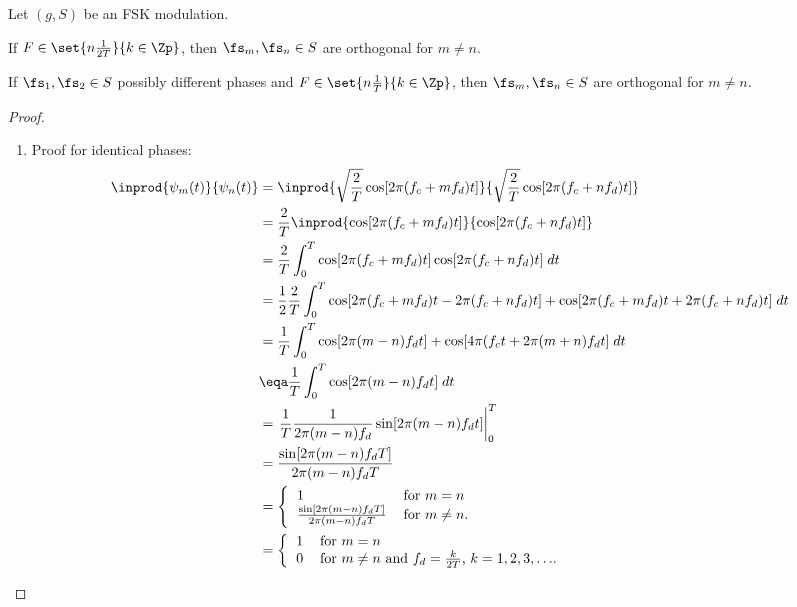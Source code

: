 \begin{theorem}
Let $(g,S)$ be an FSK modulation.
\begin{enume}
  \item If $F\in\set{n\frac{1}{2T}}{k\in\Zp}$, 
        then $\fs_m,\fs_n\in S$ are orthogonal for $m\not=n$.
  \item If $\fs_1,\fs_2\in S$ possibly different phases and
        $F\in\set{n\frac{1}{T}}{k\in\Zp}$, 
        then $\fs_m,\fs_n\in S$ are orthogonal for $m\not=n$.
\end{enume}
\end{theorem}
\begin{proof}

\begin{enumerate}
  \item Proof for identical phases:
\begin{align*}
   \inprod{\psi_m(t)}{\psi_n(t)}
     &=   \inprod{\sqrt{\frac{2}{T}}\cos[2\pi (f_c+mf_d)t]}
                 {\sqrt{\frac{2}{T}}\cos[2\pi (f_c+nf_d)t]}
   \\&=   \frac{2}{T}\inprod{\cos[2\pi (f_c+mf_d)t]}{\cos[2\pi (f_c+nf_d)t]}
   \\&=   \frac{2}{T}\int_0^T \cos[2\pi (f_c+mf_d)t] \cos[2\pi (f_c+nf_d)t] \; dt
   \\&=   \frac{1}{2}\frac{2}{T}\int_0^T \cos[2\pi(f_c+mf_d)t-2\pi(f_c+nf_d)t]+  \cos[2\pi(f_c+mf_d)t+2\pi(f_c+nf_d)t] \; dt
   \\&=   \frac{1}{T}\int_0^T \cos[2\pi(m-n)f_dt] + \cos[4\pi(f_ct+2\pi(m+n)f_dt] \; dt
   \\&\eqa \frac{1}{T}\int_0^T \cos[2\pi(m-n)f_dt]  \; dt
   \\&=   \left.\frac{1}{T} \frac{1}{2\pi(m-n)f_d} \sin[2\pi(m-n)f_dt] \right|_0^T
   \\&=   \frac{\sin[2\pi(m-n)f_dT]}{2\pi(m-n)f_d T} 
   \\&=   \left\{
          \begin{tabular}{ll}
             $1$                                           & for $m=n$ \\
             $\frac{\sin[2\pi(m-n)f_dT]}{2\pi(m-n)f_d T}$  & for $m\ne n$.
          \end{tabular}
          \right.
   \\&=   \left\{
          \begin{tabular}{ll}
             $1$                                           & for $m=n$ \\
             $0$  &       for $m\ne n$ and $f_d=\frac{k}{2T}$, $k=1,2,3,\ldots$.
          \end{tabular}
          \right.
\end{align*}


\end{enumerate}
\end{proof}
